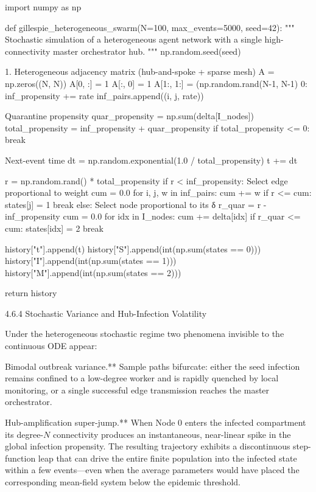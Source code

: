 import numpy as np

def gillespie_heterogeneous_swarm(N=100, max_events=5000, seed=42):
    """
    Stochastic simulation of a heterogeneous agent network
    with a single high-connectivity master orchestrator hub.
    """
    np.random.seed(seed)

1. Heterogeneous adjacency matrix (hub-and-spoke + sparse mesh)
    A = np.zeros((N, N))
    A[0, :] = 1
    A[:, 0] = 1
    A[1:, 1:] = (np.random.rand(N-1, N-1)  0:
                    inf_propensity += rate
                    inf_pairs.append((i, j, rate))

Quarantine propensity
        quar_propensity = np.sum(delta[I_nodes])
        total_propensity = inf_propensity + quar_propensity
        if total_propensity <= 0:
            break

Next-event time
        dt = np.random.exponential(1.0 / total_propensity)
        t += dt

        r = np.random.rand() * total_propensity
        if r < inf_propensity:
Select edge proportional to weight
            cum = 0.0
            for i, j, w in inf_pairs:
                cum += w
                if r <= cum:
                    states[j] = 1
                    break
        else:
Select node proportional to its δ
            r_quar = r - inf_propensity
            cum = 0.0
            for idx in I_nodes:
                cum += delta[idx]
                if r_quar <= cum:
                    states[idx] = 2
                    break

        history["t"].append(t)
        history["S"].append(int(np.sum(states == 0)))
        history["I"].append(int(np.sum(states == 1)))
        history["M"].append(int(np.sum(states == 2)))

    return history

4.6.4 Stochastic Variance and Hub-Infection Volatility

Under the heterogeneous stochastic regime two phenomena invisible to the continuous ODE appear:

Bimodal outbreak variance.**  
  Sample paths bifurcate: either the seed infection remains confined to a low-degree worker and is rapidly quenched by local monitoring, or a single successful edge transmission reaches the master orchestrator.

Hub-amplification super-jump.**  
  When Node 0 enters the infected compartment its degree-\(N\) connectivity produces an instantaneous, near-linear spike in the global infection propensity. The resulting trajectory exhibits a discontinuous step-function leap that can drive the entire finite population into the infected state within a few events—even when the average parameters would have placed the corresponding mean-field system below the epidemic threshold.

